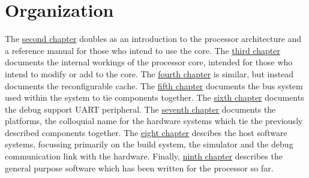 \section{Organization}
\label{sec:introduction-org}

The \hyperref[sec:core-ug]{second chapter} doubles as an introduction to the 
\rvex{} processor architecture and a reference manual for those who intend to 
use the core. The \hyperref[sec:core-int]{third chapter} documents the internal 
workings of the \rvex{} processor core, intended for those who intend to modify 
or add to the core. The \hyperref[sec:cache]{fourth chapter} is similar, but 
instead documents the reconfigurable cache. The \hyperref[sec:bus]{fifth 
chapter} documents the bus system used within the \rvex{} system to tie 
components together. The \hyperref[sec:debug]{sixth chapter} documents the debug 
support UART peripheral. The \hyperref[sec:platforms]{seventh chapter} documents 
the \rvex{} platforms, the colloquial name for the hardware systems which tie 
the previously described components together. The \hyperref[sec:host]{eight 
chapter} descibes the host software systems, focussing primarily on the build 
system, the simulator and the debug communication link with the hardware. 
Finally, \hyperref[sec:target]{ninth chapter} describes the general purpose 
software which has been written for the \rvex{} processor so far.





